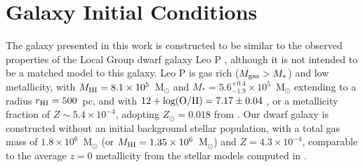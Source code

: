 \documentclass[twocolumn]{aastex61}
\begin{document}

\section{Galaxy Initial Conditions}
\label{sec:IC}
The galaxy presented in this work is constructed to be similar to the observed properties of the Local Group dwarf galaxy Leo P \citep{Giovanelli2013,McQuinn2013,McQuinn2015a,McQuinn2015}, although it is not intended to be a matched model to this galaxy. Leo P is gas rich ($M_{\rm gas} > M_{*}$) and low metallicity, with $M_{\rm HI} = 8.1\times 10^{5}$~M$_{\odot}$ and $M_{*} = 5.6^{+0.4}_{-1.9} \times 10^{5}$~M$_{\odot}$ \citep{McQuinn2015a} extending to a radius $r_{\rm HI} = 500$~pc, and with $12 + \rm{log(O/H)} = 7.17 \pm 0.04$ \citep{Skillman2013}, or a metallicity fraction of $Z \sim 5.4\times10^{-4}$, adopting $Z_{\odot} = 0.018$ from \citet{Asplund2009}. Our dwarf galaxy is constructed without an initial background stellar population, with a total gas mass of $1.8 \times 10^{6}$~M$_{\odot}$ (or $M_{\rm HI} = 1.35 \times 10^{6}$~M$_{\odot}$) and $Z = 4.3\times 10^{-4}$, comparable to the average $z = 0$ metallicity from the stellar models computed in \citet{McQuinn2015}.
\end{document}

